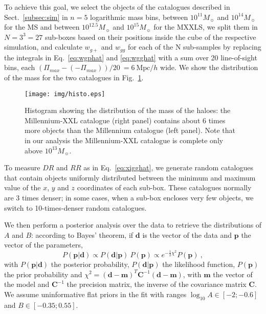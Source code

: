 \documentclass[a4paper,fleqn,usenatbib]{mnras}
\begin{document}
To achieve this goal, we select the objects of the catalogues described in Sect.~\ref{subsec:sim} in $n = 5$ logarithmic mass bins, between $10^{11} M_{\sun}$ and $10^{14} M_{\sun}$ for the MS and between $10^{12.5} M_{\sun}$ and $10^{15} M_{\sun}$ for the MXXLS, we split them in $N = 3^3 = 27$ sub-boxes based on their positions inside the cube of the respective simulation, and calculate $w_{g+}$ and $w_{gg}$ for each of the N sub-samples by replacing the integrals in Eq.~\ref{eq:wgphat} and \ref{eq:wgghat} with a sum over 20 line-of-sight bins, each $(\Pi_{max} - (-\Pi_{max}))/ 20 \ = 6 \ \mbox{Mpc}/h$ wide. We show the distribution of the mass for the two catalogues in Fig.~\ref{fig:histo}. 
\begin{figure}
	\centerline{
	\texttt{[image: img/histo.eps]}}
	\caption{Histogram showing the distribution of the mass of the haloes: the Millennium-XXL catalogue (right panel) contains about 6 times more objects than the Millennium catalogue (left panel). Note that in our analysis the Millennium-XXL catalogue is complete only above $10^{13} M_{\sun}$.}
	\label{fig:histo}
\end{figure}

To measure $DR$ and $RR$ as in Eq.~\ref{eq:xigghat}, we generate random catalogues that contain objects uniformly distributed between the minimum and maximum value of the $x$, $y$ and $z$ coordinates of each sub-box. These catalogues normally are 3 times denser; in some cases, when a sub-box encloses very few objects, we switch to 10-times-denser random catalogues.

We then perform a posterior analysis over the data to retrieve the distributions of $A$ and $B$: according to Bayes' theorem, if $\boldsymbol{d}$ is the vector of the data and $\boldsymbol{p}$ the vector of the parameters, 
\begin{equation}
    P(\boldsymbol{p} | \boldsymbol{d}) \propto P(\boldsymbol{d} | \boldsymbol{p}) \ P(\boldsymbol{p}) \propto e^{-\frac{1}{2} \chi ^2} P(\boldsymbol{p}) \ ,
	\label{eq:bayes}
\end{equation}
with $P(\boldsymbol{p} | \boldsymbol{d})$ the posterior probability, $P(\boldsymbol{d} | \boldsymbol{p})$ the likelihood function, $P(\boldsymbol{p})$ the prior probability and $\chi ^2 = (\boldsymbol{d} - \boldsymbol{m})^T \mathbf{C}^{-1} (\boldsymbol{d} - \boldsymbol{m})$, with $\boldsymbol{m}$ the vector of the model and $\mathbf{C}^{-1}$ the precision matrix, the inverse of the covariance matrix $\mathbf{C}$. We assume uninformative flat priors in the fit with ranges $\log_{10} A \in [-2;-0.6]$ and $B \in [-0.35;0.55]$. 
\end{document}

